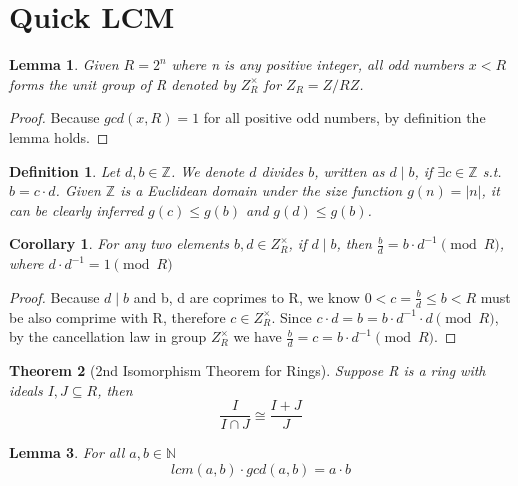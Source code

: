 \documentclass{article}
\newtheorem{theorem}{Theorem}[section]
\newtheorem{corollary}{Corollary}[theorem]
\newtheorem{lemma}[theorem]{Lemma}
\newtheorem{definition}{Definition}
\begin{document}
    \section{Quick LCM}

    \begin{lemma}
        Given \(R=2^n\) where n is any positive integer, all odd numbers \(x < R\) forms the
        unit group of R denoted by \(Z_R^{\times}\) for \(Z_R=Z/RZ\).
    \end{lemma}

    \renewcommand\qedsymbol{$\blacksquare$}

    \begin{proof}
        Because \(gcd(x, R)=1\) for all positive odd numbers, by definition the lemma holds.
    \end{proof}

    \begin{definition}
        Let \(d, b \in \mathbb{Z}\). We denote \(d\) divides \(b\), written as \(d \mid b\), if \(\exists c \in \mathbb{Z}\) s.t. \(b = c \cdot d\).
        Given \(\mathbb{Z}\) is a Euclidean domain under the size function \( g(n)=|n| \), it can be clearly inferred
        \(g(c) \leq g(b)\) and \(g(d) \leq g(b)\).
    \end{definition}


    \begin{corollary}
        \label{coro1}
        For any two elements \(b, d \in Z_R^\times\), if \(d \mid b\), then \(\frac{b}{d}=b \cdot d^{-1} \pmod{R}\),
        where
        \(d \cdot d^{-1}=1 \pmod{R}\)
    \end{corollary}

    \begin{proof}
        Because \(d \mid b\) and b, d are coprimes to R, we know \(0 < c=\frac{b}{d} \leq b < R\) must be also comprime
        with R, therefore \(c \in Z_R^{\times}\). Since \(c \cdot d = b = b \cdot d^{-1} \cdot d \pmod{R}\), by the
        cancellation law in group \(Z_R^\times\) we have \(\frac{b}{d}= c = b \cdot d^{-1} \pmod{R}\).
    \end{proof}


    \begin{theorem}[2nd Isomorphism Theorem for Rings]
        \label{2iso}
        Suppose R is a ring with ideals \(I, J \subseteq R \), then
        \[ \frac{I}{I \cap J} \cong \frac{I+J}{J}\]
    \end{theorem}


    \begin{lemma}
        \label{liso}
        For all \(a, b \in \mathbb{N}\)
        \[ lcm(a,b) \cdot gcd(a, b) = a \cdot b\]
    \end{lemma}
\end{document}
